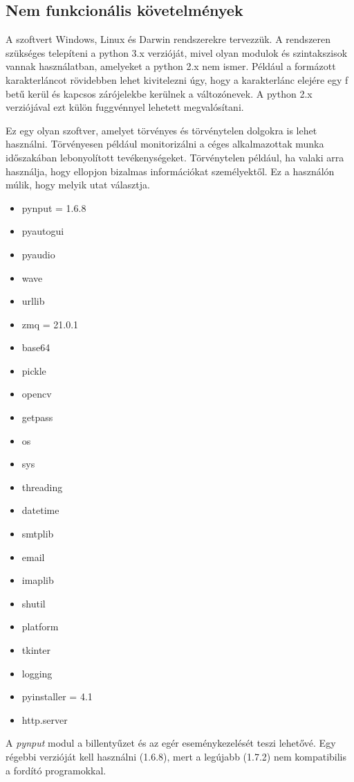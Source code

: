 \documentclass[12pt,a4paper,oneside]{report}
\begin{document}
\subsection{Nem funkcionális követelmények}
A szoftvert Windows, Linux és Darwin rendszerekre tervezzük. A rendszeren szükséges telepíteni a python 3.x verzióját, mivel olyan modulok és szintakszisok vannak használatban, amelyeket a python 2.x nem ismer. Például a formázott karakterláncot rövidebben lehet kivitelezni úgy, hogy a karakterlánc elejére egy f betű kerül és kapcsos zárójelekbe kerülnek a változónevek. A python 2.x verziójával ezt külön fuggvénnyel lehetett megvalósítani.

Ez egy olyan szoftver, amelyet törvényes és törvénytelen dolgokra is lehet használni. Törvényesen például monitorizálni a céges alkalmazottak munka időszakában lebonyolított tevékenységeket. Törvénytelen például, ha valaki arra használja, hogy ellopjon bizalmas információkat személyektől. Ez a használón múlik, hogy melyik utat választja.

\begin{multicols}{2}
\begin{itemize}
\item pynput = 1.6.8
\item pyautogui
\item pyaudio
\item wave
\item urllib
\item zmq = 21.0.1
\item base64
\item pickle
\item opencv
\item getpass
\item os
\item sys
\item threading
\item datetime
\item smtplib
\item email
\item imaplib
\item shutil
\item platform
\item tkinter
\item logging
\item pyinstaller = 4.1
\item http.server
\end{itemize}
\end{multicols}
A \emph{pynput} modul a billentyűzet és az egér eseménykezelését teszi lehetővé. Egy régebbi verzióját kell használni (1.6.8), mert a legújabb (1.7.2) nem kompatibilis a fordító programokkal.
\end{document}

